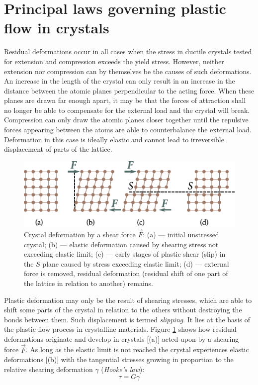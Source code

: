 \section{Principal laws governing plastic flow in crystals}\label{sec:14}

Residual deformations occur in all cases when the stress in ductile crystals tested for extension and compression exceeds the yield stress. However, neither extension nor compression can by themselves be the causes of such deformations. An increase in the length of the crystal can only result in an increase in the distance between the atomic planes perpendicular to the acting force. When these planes are drawn far enough apart, it may be that the forces of attraction shall no longer be able to compensate for the external load and the crystal will break. Compression can only draw the atomic planes closer together until the repulsive forces appearing between the atoms are able to counterbalance the external load. Deformation in this case is ideally elastic and cannot lead to irreversible displacement of parts of the lattice.

\begin{figure}[t]
	\begin{center}
		\includegraphics[scale=1.0]{figures/ch_02/fig_2_4.pdf}
		\caption[]{Crystal deformation by a shear force $\vec{F}$: (a) --- initial unstressed crystal; (b) --- elastic deformation caused by shearing stress not exceeding elastic limit; (c) --- early stages of plastic shear (slip) in the $S$ plane caused by stress exceeding elastic limit; (d) --- external force is removed, residual deformation (residual shift of one part of the lattice in relation to another) remains.}
		\label{fig:2_4}
	\end{center}
	\vspace{-0.7cm}
\end{figure}

Plastic deformation may only be the result of shearing stresses, which are able to shift some parts of the crystal in relation to the others without destroying the bonds between them. Such displacement is termed \textit{slipping}. It lies at the basis of the plastic flow process in crystalline materials. Figure \ref{fig:2_4} shows how residual deformations originate and develop in crystals [(a)] acted upon by a shearing force $\vec{F}$. As long as the elastic limit is not reached the crystal experiences elastic deformations [(b)] with the tangential stresses growing in proportion to the relative shearing deformation $\gamma$ (\textit{Hooke's law}):
\begin{equation}\label{eq:2_10}
	\tau = G \gamma
\end{equation}

